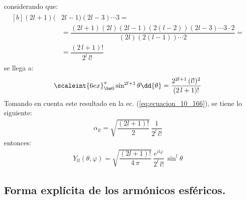 considerando que:
\begin{align}
\begin{aligned}[b]
(2 l {+} 1)( &2 l {-} 1)(2 l {-} 3) \cdots 3 = \\[0.5em]
&= \dfrac{(2 l {+} 1)(2 l) (2 l {-} 1)(2 (l {-} 2))(2 l {-} 3) \cdots 3 \cdot 2}{(2 l)(2 (l {-} 1)) \cdots 2} = \\[0.5em]
&= \dfrac{(2 \, l + 1)!}{2^{l} \, l!}
\end{aligned}
\label{eq:ecuacion_10_169}
\end{align}
se llega a:
\begin{align}
\scaleint{6ex}_{\bs 0}^{\pi} \sin^{2l+1} \theta \dd{\theta} = \dfrac{2^{2l+1} \, (l!)^{2}}{(2 \, l + 1)!}
\label{eq:ecuacion_10_170}
\end{align}
Tomando en cuenta este resultado en la ec. (\ref{eq:ecuacion_10_166}), se tiene lo siguiente:
\begin{align}
\alpha_{ll} = \sqrt{\dfrac{(2 l + 1)!}{2}} \, \dfrac{1}{2^{l} \, l!}
\label{eq:ecuacion_10_171}
\end{align}
entonces:
\begin{align}
Y_{ll} (\theta, \varphi) = \sqrt{\dfrac{(2 l + 1)!}{4 \, \pi}} \, \dfrac{e^{i l \varphi}}{2^{l} \, l!} \, \sin^{l} \theta
\label{eq:ecuacion_10_172}
\end{align}

\subsection{Forma explícita de los armónicos esféricos.}

